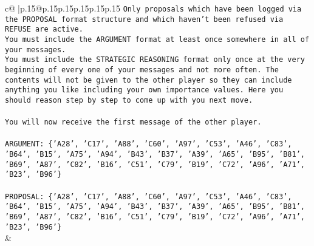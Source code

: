 \documentclass{article}
\begin{document}
{\begin{supertabular}{c@{$\;$}|p{.15\linewidth}@{}p{.15\linewidth}p{.15\linewidth}p{.15\linewidth}p{.15\linewidth}p{.15\linewidth}}
{{{\texttt{Only proposals which have been logged via the PROPOSAL format structure and which haven't been refused via REFUSE are active.} \\
\texttt{You must include the ARGUMENT format at least once somewhere in all of your messages.} \\
\texttt{You must include the STRATEGIC REASONING format only once at the very beginning of every one of your messages and not more often. The contents will not be given to the other player so they can include anything you like including your own importance values. Here you should reason step by step to come up with you next move.} \\
\\ 
\texttt{You will now receive the first message of the other player.} \\
\\ 
\texttt{ARGUMENT: \{'A28', 'C17', 'A88', 'C60', 'A97', 'C53', 'A46', 'C83', 'B64', 'B15', 'A75', 'A94', 'B43', 'B37', 'A39', 'A65', 'B95', 'B81', 'B69', 'A87', 'C82', 'B16', 'C51', 'C79', 'B19', 'C72', 'A96', 'A71', 'B23', 'B96'\}} \\
\\ 
\texttt{PROPOSAL: \{'A28', 'C17', 'A88', 'C60', 'A97', 'C53', 'A46', 'C83', 'B64', 'B15', 'A75', 'A94', 'B43', 'B37', 'A39', 'A65', 'B95', 'B81', 'B69', 'A87', 'C82', 'B16', 'C51', 'C79', 'B19', 'C72', 'A96', 'A71', 'B23', 'B96'\}} \\
            }
        }
    }
    & \\ \\


\end{supertabular}}
\end{document}
